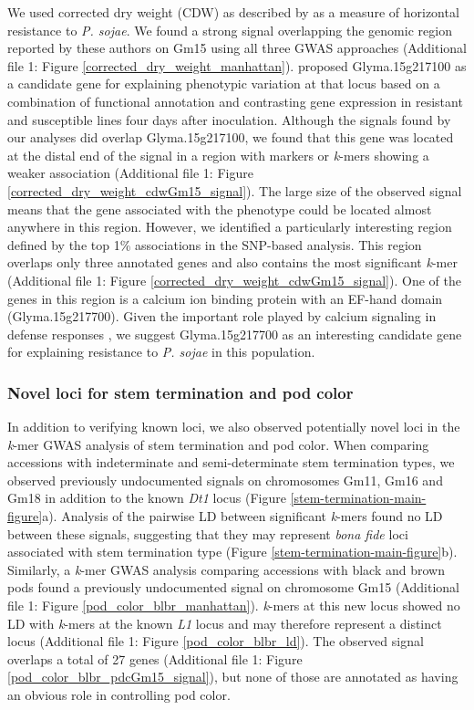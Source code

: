 We used corrected dry weight (CDW) as described by \cite{deronne2022} as a
measure of horizontal resistance to \emph{P. sojae}. We found a strong signal
overlapping the genomic region reported by these authors on Gm15 using all three GWAS
approaches (Additional file 1: Figure \ref{corrected_dry_weight_manhattan}). \cite{deronne2022}
proposed Glyma.15g217100 as a candidate gene for explaining phenotypic
variation at that locus based on a combination of functional annotation and
contrasting gene expression in resistant and susceptible lines four days after
inoculation. Although the signals found by our analyses did overlap
Glyma.15g217100, we found that this gene was located at the distal end of the signal
in a region with markers or \emph{k}-mers showing a weaker
association (Additional file 1: Figure \ref{corrected_dry_weight_cdwGm15_signal}). The
large size of the observed signal means that the gene associated with the phenotype could
be located almost anywhere in this region. However, we identified a particularly
interesting region defined by the top 1\% associations in the SNP-based
analysis. This region overlaps only three annotated genes and also contains the
most significant \emph{k}-mer (Additional file 1: Figure
\ref{corrected_dry_weight_cdwGm15_signal}). One of the genes in this region is
a calcium ion binding protein with an EF-hand domain (Glyma.15g217700).
Given the important role played by calcium signaling in defense
responses \citep{zhang2014}, we suggest Glyma.15g217700 as an interesting
candidate gene for explaining resistance to \emph{P. sojae} in this population.

\subsubsection*{Novel loci for stem termination and pod color}
\label{sv-gwas-main-results-novel-loci}

In addition to verifying known loci, we also observed potentially novel loci in
the \textit{k}-mer GWAS analysis of stem termination and pod color.  When
comparing accessions with indeterminate and semi-determinate stem termination
types, we observed previously undocumented signals on chromosomes Gm11, Gm16
and Gm18 in addition to the known \textit{Dt1} locus (Figure
\ref{stem-termination-main-figure}a).  Analysis of the pairwise LD between
significant \textit{k}-mers found no LD between these signals, suggesting that
they may represent \textit{bona fide} loci associated with stem termination
type (Figure \ref{stem-termination-main-figure}b). Similarly, a \textit{k}-mer
GWAS analysis comparing accessions with black and brown pods found a previously
undocumented signal on chromosome Gm15 (Additional file 1: Figure \ref{pod_color_blbr_manhattan}).
\textit{k}-mers at this new locus
showed no LD with \textit{k}-mers at the known \textit{L1} locus and may
therefore represent a distinct locus (Additional file 1: Figure 
\ref{pod_color_blbr_ld}). The observed signal overlaps a total of 27 genes
(Additional file 1: Figure \ref{pod_color_blbr_pdcGm15_signal}), but none of those are annotated
as having an obvious role in controlling pod color.

